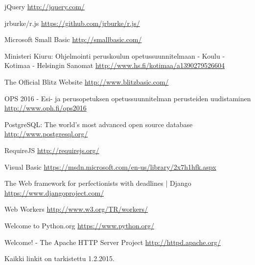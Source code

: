 \begin{thebibliography}{99}
	jQuery \url{http://jquery.com/}
	
	jrburke/r.js \url{https://github.com/jrburke/r.js/}
	
	Microsoft Small Basic \url{http://smallbasic.com/}
	
	Ministeri Kiuru: Ohjelmointi peruskoulun opetussuunnitelmaan - Koulu - Kotimaa - Helsingin Sanomat \url{http://www.hs.fi/kotimaa/a1390279526604}
	
	The Official Blitz Website \url{http://www.blitzbasic.com/}
	
	OPS 2016 - Esi- ja perusopetuksen opetussuunnitelman perusteiden uudistaminen \url{http://www.oph.fi/ops2016}
	
	PostgreSQL: The world's most advanced open source database \url{http://www.postgresql.org/}

	RequireJS \url{http://requirejs.org/}

	Visual Basic \url{https://msdn.microsoft.com/en-us/library/2x7h1hfk.aspx}

	The Web framework for perfectionists with deadlines | Django \url{https://www.djangoproject.com/}
	
	Web Workers \url{http://www.w3.org/TR/workers/}

	Welcome to Python.org \url{https://www.python.org/}
	
	Welcome! - The Apache HTTP Server Project \url{http://httpd.apache.org/}

\end{thebibliography}

Kaikki linkit on tarkistettu 1.2.2015.
